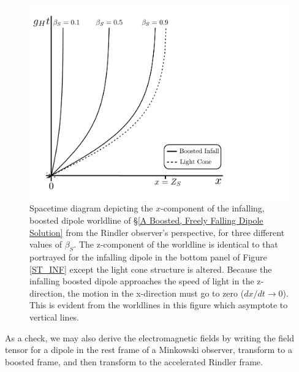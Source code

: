 \begin{figure}
\begin{center}
\includegraphics[scale=0.4]{figures/ch6/InfallBoost_stDiagram.pdf} 
\end{center}
\caption{Spacetime diagram depicting the $x$-component of the
  infalling, boosted dipole worldline of \S\ref{A Boosted, Freely
    Falling Dipole Solution} from the Rindler observer's perspective,
  for three different values of $\beta_S$. The z-component of the
  worldline is identical to that portrayed for the infalling dipole in
  the bottom panel of Figure \ref{ST_INF} except the light cone
  structure is altered. Because the infalling boosted dipole
  approaches the speed of light in the z-direction, the
 motion in the x-direction must go to zero ($dx/dt\rightarrow 0$). This is evident from the
  worldlines in this figure which asymptote to vertical lines.}
\label{ST_INFBoost}
\end{figure}


As a check, we may also derive the electromagnetic fields by writing the field tensor for
a dipole in the rest frame of a Minkowski observer, transform to a
boosted frame, and then transform to the accelerated Rindler
frame. 


